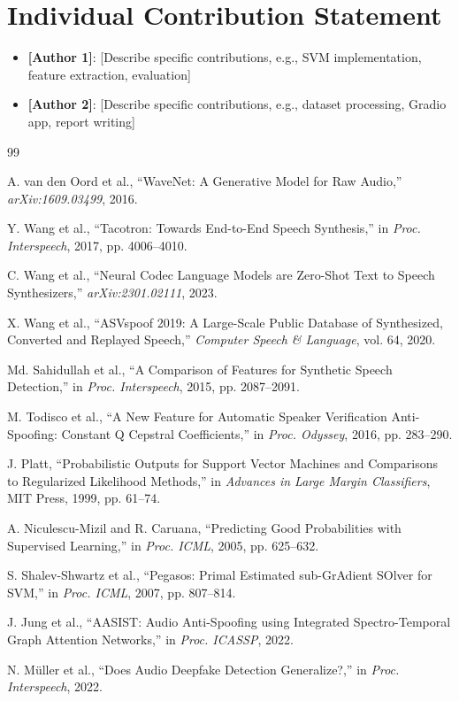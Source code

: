 \documentclass[conference]{IEEEtran}
\begin{document}
\section{Individual Contribution Statement}
\begin{itemize}
  \item \textbf{[Author 1]}: [Describe specific contributions, e.g., SVM
    implementation, feature extraction, evaluation]
  \item \textbf{[Author 2]}: [Describe specific contributions, e.g., dataset
    processing, Gradio app, report writing]
\end{itemize}

\begin{thebibliography}{99}

A. van den Oord et al., ``WaveNet: A Generative Model for Raw Audio,''
\emph{arXiv:1609.03499}, 2016.

Y. Wang et al., ``Tacotron: Towards End-to-End Speech Synthesis,''
in \emph{Proc. Interspeech}, 2017, pp. 4006--4010.

C. Wang et al., ``Neural Codec Language Models are Zero-Shot Text to Speech
Synthesizers,'' \emph{arXiv:2301.02111}, 2023.

X. Wang et al., ``ASVspoof 2019: A Large-Scale Public Database of Synthesized,
Converted and Replayed Speech,'' \emph{Computer Speech \& Language},
vol. 64, 2020.

Md. Sahidullah et al., ``A Comparison of Features for Synthetic Speech Detection,''
in \emph{Proc. Interspeech}, 2015, pp. 2087--2091.

M. Todisco et al., ``A New Feature for Automatic Speaker Verification Anti-Spoofing:
Constant Q Cepstral Coefficients,'' in \emph{Proc. Odyssey}, 2016, pp. 283--290.

J. Platt, ``Probabilistic Outputs for Support Vector Machines and Comparisons
to Regularized Likelihood Methods,'' in \emph{Advances in Large Margin Classifiers},
MIT Press, 1999, pp. 61--74.

A. Niculescu-Mizil and R. Caruana, ``Predicting Good Probabilities with Supervised
Learning,'' in \emph{Proc. ICML}, 2005, pp. 625--632.

S. Shalev-Shwartz et al., ``Pegasos: Primal Estimated sub-GrAdient SOlver for SVM,''
in \emph{Proc. ICML}, 2007, pp. 807--814.

J. Jung et al., ``AASIST: Audio Anti-Spoofing using Integrated Spectro-Temporal Graph
Attention Networks,'' in \emph{Proc. ICASSP}, 2022.

N. M\"{u}ller et al., ``Does Audio Deepfake Detection Generalize?,''
in \emph{Proc. Interspeech}, 2022.

\end{thebibliography}
\end{document}
